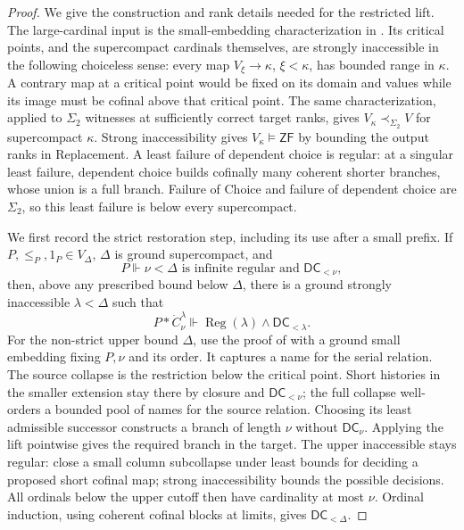 \documentclass[11pt,a4paper]{amsart}
\newcommand{\ZF}{\mathsf{ZF}}
\newcommand{\DC}{\mathsf{DC}}
\theoremstyle{plain}
\theoremstyle{definition}
\theoremstyle{remark}
\begin{document}
\begin{proof}
We give the construction and rank details needed for the restricted
lift.  The large-cardinal input is the small-embedding characterization
in \cite[Lemma~222]{Woodin}.  Its critical points, and the supercompact
cardinals themselves, are strongly inaccessible in the following
choiceless sense: every map $V_\xi\to\kappa$, $\xi<\kappa$, has
bounded range in $\kappa$.  A contrary map at a critical point would
be fixed on its domain and values while its image must be cofinal
above that critical point.  The same characterization, applied to
$\Sigma_2$ witnesses at sufficiently correct target ranks, gives
$V_\kappa\prec_{\Sigma_2}V$ for supercompact $\kappa$.
Strong inaccessibility gives $V_\kappa\models\ZF$ by bounding the
output ranks in Replacement.  A least failure of dependent choice
is regular: at a singular least failure, dependent choice builds
cofinally many coherent shorter branches, whose union is a full
branch.  Failure of Choice and failure of dependent choice are
$\Sigma_2$, so this least failure is below every supercompact.

We first record the strict restoration step, including its use
after a small prefix.  If $P,\leq_P,1_P\in V_\Delta$, $\Delta$ is
ground supercompact, and
\[
P\Vdash \nu<\Delta\text{ is infinite regular and }\DC_{<\nu},
\]
then, above any prescribed bound below $\Delta$, there is a ground
strongly inaccessible $\lambda<\Delta$ such that
\[
P*\dot C_\nu^\lambda\Vdash
 \operatorname{Reg}(\lambda)\land\DC_{<\lambda}.
\]
For the non-strict upper bound $\Delta$, use the proof of
\cite[Lemma~225]{Woodin} with a ground small embedding fixing
$P,\nu$ and its order.  It captures a name for the serial relation.
The source collapse is the restriction below the critical point.
Short histories in the smaller extension stay there by closure
and $\DC_{<\nu}$; the full collapse well-orders a bounded pool of
names for the source relation.  Choosing its least admissible
successor constructs a branch of length $\nu$ without
$\DC_\nu$.  Applying the lift pointwise gives the required branch
in the target.  The upper inaccessible stays regular: close a
small column subcollapse under least bounds for deciding a proposed
short cofinal map; strong inaccessibility bounds the possible
decisions.  All ordinals below the upper cutoff then have
cardinality at most $\nu$.  Ordinal induction, using coherent
cofinal blocks at limits, gives $\DC_{<\Delta}$.


\end{proof}
\end{document}
